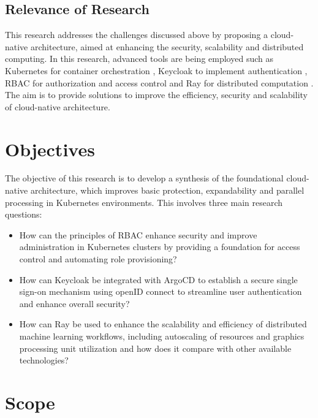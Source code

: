 \subsection{Relevance of Research}

This research addresses the challenges discussed above by proposing a cloud-native architecture, aimed at enhancing the security, scalability and distributed computing. In this research, advanced tools are being employed such as Kubernetes for container orchestration \cite{r6}, Keycloak to implement authentication \cite{r7}, RBAC for authorization and access control and Ray for distributed computation \cite{r8}. The aim is to provide solutions to improve the efficiency, security and scalability of cloud-native architecture. 

\section{Objectives}

The objective of this research is to develop a synthesis of the foundational cloud-native architecture, which improves basic protection, expandability and parallel processing in Kubernetes environments. This involves three main research questions: 

\begin{itemize}

\item How can the principles of RBAC enhance security and improve administration in Kubernetes clusters by providing a foundation for access control and automating role provisioning?


\item How can Keycloak be integrated with ArgoCD to establish a secure single sign-on  mechanism using openID connect  to streamline user authentication and enhance overall security?


\item How can Ray be used to enhance the scalability and efficiency of distributed machine learning workflows, including autoscaling of resources and graphics processing unit  utilization and how does it compare with other available technologies?

\end{itemize}

\section{Scope}

